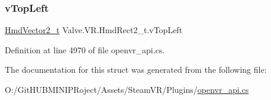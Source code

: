 \mbox{\label{struct_valve_1_1_v_r_1_1_hmd_rect2__t_a1743312b38de1a8c4f85245c540ac86f}} 
\subsubsection{\texorpdfstring{vTopLeft}{vTopLeft}}
{\footnotesize\ttfamily \mbox{\hyperlink{struct_valve_1_1_v_r_1_1_hmd_vector2__t}{Hmd\+Vector2\+\_\+t}} Valve.\+V\+R.\+Hmd\+Rect2\+\_\+t.\+v\+Top\+Left}



Definition at line 4970 of file openvr\+\_\+api.\+cs.



The documentation for this struct was generated from the following file\+:\begin{DoxyCompactItemize}
\item 
O\+:/\+Git\+H\+U\+B\+M\+I\+N\+I\+P\+Roject/\+Assets/\+Steam\+V\+R/\+Plugins/\mbox{\hyperlink{openvr__api_8cs}{openvr\+\_\+api.\+cs}}\end{DoxyCompactItemize}
